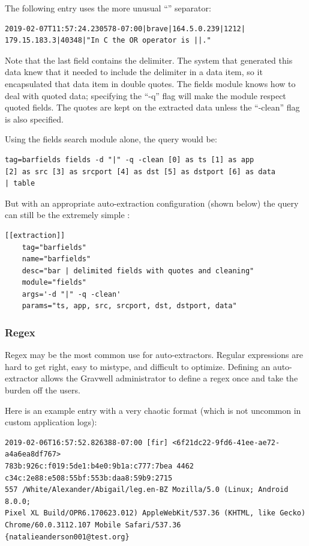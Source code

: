 
The following entry uses the more unusual ``\textbar{}'' separator:

\begin{Verbatim}[breaklines=true]
2019-02-07T11:57:24.230578-07:00|brave|164.5.0.239|1212|
179.15.183.3|40348|"In C the OR operator is ||."
\end{Verbatim}

Note that the last field contains the delimiter. The system that
generated this data knew that it needed to include the delimiter in a
data item, so it encapsulated that data item in double quotes. The
fields module knows how to deal with quoted data; specifying the ``-q''
flag will make the module respect quoted fields. The quotes are kept on
the extracted data unless the ``-clean'' flag is also specified.

Using the fields search module alone, the query would be:

\begin{Verbatim}[breaklines=true]
tag=barfields fields -d "|" -q -clean [0] as ts [1] as app 
[2] as src [3] as srcport [4] as dst [5] as dstport [6] as data
| table
\end{Verbatim}

But with an appropriate auto-extraction configuration (shown below) the
query can still be the extremely simple :

\begin{Verbatim}[breaklines=true]
[[extraction]]
    tag="barfields"
    name="barfields"
    desc="bar | delimited fields with quotes and cleaning"
    module="fields"
    args='-d "|" -q -clean'
    params="ts, app, src, srcport, dst, dstport, data"
\end{Verbatim}

\subsubsection{Regex}

Regex may be the most common use for auto-extractors. Regular
expressions are hard to get right, easy to mistype, and difficult to
optimize. Defining an auto-extractor allows the Gravwell administrator
to define a regex once and take the burden off the users.

Here is an example entry with a very chaotic format (which is not
uncommon in custom application logs):

\begin{Verbatim}[breaklines=true]
2019-02-06T16:57:52.826388-07:00 [fir] <6f21dc22-9fd6-41ee-ae72-a4a6ea8df767> 
783b:926c:f019:5de1:b4e0:9b1a:c777:7bea 4462 c34c:2e88:e508:55bf:553b:daa8:59b9:2715 
557 /White/Alexander/Abigail/leg.en-BZ Mozilla/5.0 (Linux; Android 8.0.0; 
Pixel XL Build/OPR6.170623.012) AppleWebKit/537.36 (KHTML, like Gecko) 
Chrome/60.0.3112.107 Mobile Safari/537.36 {natalieanderson001@test.org}
\end{Verbatim}

